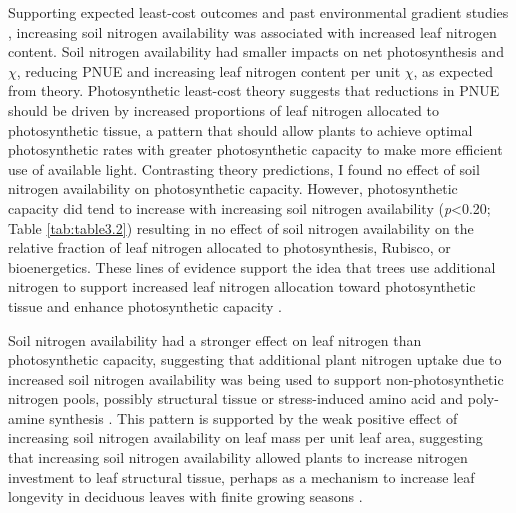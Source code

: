 Supporting expected least-cost outcomes and past environmental gradient studies , increasing soil nitrogen availability was associated with increased leaf nitrogen content. Soil nitrogen availability had smaller impacts on net photosynthesis and $\chi$, reducing PNUE and increasing leaf nitrogen content per unit $\chi$, as expected from theory. Photosynthetic least-cost theory suggests that reductions in PNUE should be driven by increased proportions of leaf nitrogen allocated to photosynthetic tissue, a pattern that should allow plants to achieve optimal photosynthetic rates with greater photosynthetic capacity to make more efficient use of available light. Contrasting theory predictions, I found no effect of soil nitrogen availability on photosynthetic capacity. However, photosynthetic capacity did tend to increase with increasing soil nitrogen availability (\textit{p}<0.20; Table \ref{tab:table3.2}) resulting in no effect of soil nitrogen availability on the relative fraction of leaf nitrogen allocated to photosynthesis, Rubisco, or bioenergetics. These lines of evidence support the idea that trees use additional nitrogen to support increased leaf nitrogen allocation toward photosynthetic tissue and enhance photosynthetic capacity .

Soil nitrogen availability had a stronger effect on leaf nitrogen than photosynthetic capacity, suggesting that additional plant nitrogen uptake due to increased soil nitrogen availability was being used to support non-photosynthetic nitrogen pools, possibly structural tissue or stress-induced amino acid and poly-amine synthesis . This pattern is supported by the weak positive effect of increasing soil nitrogen availability on leaf mass per unit leaf area, suggesting that increasing soil nitrogen availability allowed plants to increase nitrogen investment to leaf structural tissue, perhaps as a mechanism to increase leaf longevity in deciduous leaves with finite growing seasons .
    
